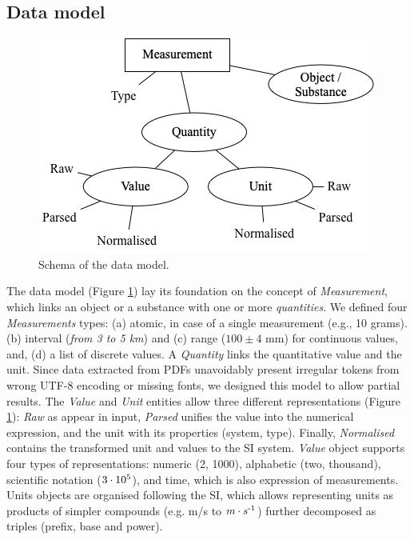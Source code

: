 \documentclass[sigconf]{acmart}
\begin{document}
\subsection{Data model}
\label{subsub:data-model}
\begin{figure}[ht]
  \centering
  \includegraphics[width=\linewidth]{images/schema-2}
  \caption{Schema of the data model.}
  \label{fig:data-model-schema-2}
\end{figure}

The data model (Figure \ref{fig:data-model-schema-2}) lay its foundation on the concept of \textit{Measurement}, which links an object or a substance with one or more \textit{quantities}. We defined four \textit{Measurements} types: (a) atomic, in case of a single measurement (e.g., 10 grams). (b) interval (\textit{from 3 to 5 km}) and (c) range ($100 \pm 4$ mm) for continuous values, and, (d) a list of discrete values. A \textit{Quantity} links the quantitative value and the unit. 
Since data extracted from PDFs unavoidably present irregular tokens from wrong UTF-8 encoding or missing fonts, we designed this model to allow partial results. The \textit{Value} and \textit{Unit} entities allow three different representations (Figure \ref{fig:data-model-schema-2}): \textit{Raw} as appear in input, \textit{Parsed} unifies the value into the numerical expression, and the unit with its properties (system, type). Finally, \textit{Normalised} contains the transformed unit and values to the SI system. \textit{Value} object supports four types of representations: numeric (2, 1000), alphabetic (two, thousand), scientific notation ($3\cdot10\textsuperscript{5}$), and time, which is also expression of measurements. Units objects are organised following the SI, which allows representing units as products of simpler compounds (e.g. m/s to $m \cdot s\textsuperscript{-1}$) further decomposed as triples (prefix, base and power).
\end{document}
